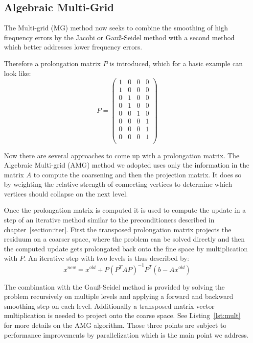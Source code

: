 \documentclass[a4paper,11pt]{scrartcl}
\begin{document}
\subsection{Algebraic Multi-Grid}
The Multi-grid (MG) method now seeks to combine the smoothing of high
frequency errors by the Jacobi or Gauß-Seidel method with a second method which
better addresses lower frequency errors.

Therefore a prolongation matrix $P$ is introduced, which for a basic example
can look like:
$$P =
\begin{pmatrix}
  1 & 0 & 0 & 0 \\
  1 & 0 & 0 & 0 \\
  0 & 1 & 0 & 0 \\
  0 & 1 & 0 & 0 \\
  0 & 0 & 1 & 0 \\
  0 & 0 & 0 & 1 \\
  0 & 0 & 0 & 1 \\
  0 & 0 & 0 & 1 \\
\end{pmatrix}
$$

Now there are several approaches to come up with a prolongation matrix.
The Algebraic Multi-grid (AMG) method we adopted uses only the information
in the matrix $A$ to compute the coarsening and then the projection matrix.
It does so by weighting the relative strength of connecting vertices to
determine which vertices should collapse on the next level.

Once the prolongation matrix is computed it is used to compute the update in a
step of an iterative method similar to the preconditioners described in
chapter~\ref{section:iter}.
First the transposed prolongation matrix projects the residuum on a
coarser space, where the problem can be solved directly and then the computed
update gets prolongated back onto the fine space by multiplication with $P$.
An iterative step with two levels is thus described by:
$$x^{new} = x^{old} + P (P^{T} A P)^{-1} P^{T} (b - A x^{old})$$

The combination with the Gauß-Seidel method is provided by solving the problem
recursively on multiple levels and applying a forward and backward smoothing
step on each level. Additionally a transposed matrix vector multiplication
is needed to project onto the coarse space.
See Listing~\ref{lst:mult} for more details on the AMG algorithm.
Those three points are subject to performance improvements by parallelization
which is the main point we address.
\cite{multigrid}
\end{document}
